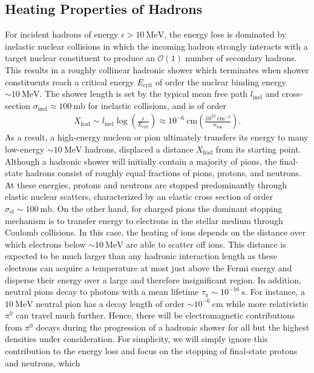 \documentclass[twocolumn,showpacs,preprintnumbers,amsmath,amssymb,prd]{revtex4}
\newcommand{\OO}{\mathcal{O}}
\newcommand{\MeV}{\text{MeV}}
\def\r{\right)}
\def\l{\left(}
\begin{document}
\subsection{Heating Properties of Hadrons}

For incident hadrons of energy $\epsilon > 10 ~\text{MeV}$, the energy loss is dominated by inelastic nuclear collisions in which the incoming hadron strongly interacts with a target nuclear constituent to produce an $\OO(1)$ number of secondary hadrons.
This results in a roughly collinear hadronic shower which terminates when shower constituents reach a critical energy $E_\text{crit}$ of order the nuclear binding energy $\sim 10 ~\text{MeV}$. 
The shower length is set by the typical mean free path $l_\text{inel}$ and cross-section $\sigma_\text{inel} \approx 100 ~\text{mb}$ for inelastic collisions, and is of order
\begin{align}
\label{eq:hadlength}
  X_\text{had} \sim l_\text{inel} \log\l\frac{\epsilon}{E_\text{crit}}\r
  \approx 10^{-6} ~\text{cm} \l\frac{10^{32}~\text{cm}^{-3}}{n_\text{ion}}\r. 
\end{align}
As a result, a high-energy nucleon or pion ultimately transfers its energy to many low-energy $\sim 10 ~\text{MeV}$ hadrons, displaced a distance $X_\text{had}$ from its starting point.
Although a hadronic shower will initially contain a majority of pions, the final-state hadrons consist of roughly equal fractions of pions, protons, and neutrons. 
At these energies, protons and neutrons are stopped predominantly through elastic nuclear scatters, characterized by an elastic cross section of order $\sigma_\text{el} \sim 100 ~\text{mb}$. 
On the other hand, for charged pions the dominant stopping mechanism is to transfer energy to electrons in the stellar medium through Coulomb collisions.
In this case, the heating of ions depends on the distance over which electrons below $\sim 10~\MeV$ are able to scatter off ions. 
This distance is expected to be much larger than any hadronic interaction length as these electrons can acquire a temperature at most just above the Fermi energy and disperse their energy over a large and therefore insignificant region. 
In addition, neutral pions decay to photons with a mean lifetime $\tau_\pi \sim 10^{-16} ~\text{s}$. 
For instance, a $10 ~\text{MeV}$ neutral pion has a decay length of order $\sim 10^{-6} ~\text{cm}$ while more relativistic $\pi^0$ can travel much further.
Hence, there will be electromagnetic contributions from $\pi^0$ decays during the progression of a hadronic shower for all but the highest densities under consideration. 
For simplicity, we will simply ignore this contribution to the energy loss and focus on the stopping of final-state protons and neutrons, which  
\end{document}
